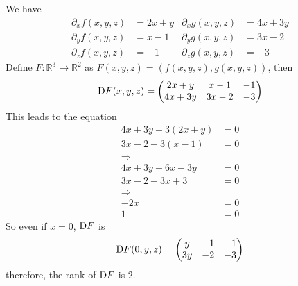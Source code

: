 \begin{solution}
    We have
    \begin{align}
        \partial_x f(x, y, z) &= 2x + y & \partial_x g(x, y, z) &= 4x + 3y \\
        \partial_y f(x, y, z) &= x - 1 & \partial_y g(x, y, z) &= 3x - 2 \\
        \partial_z f(x, y, z) &= -1 & \partial_z g(x, y, z) &= -3
    \end{align}
    Define \(F: \mathbb{R}^3 \rightarrow \mathbb{R}^2\) as \(F(x, y, z) = (f(x, y, z), g(x, y, z))\), then
    \begin{align}
        \mathop{}\!\mathrm{D} F (x, y, z) =
        \begin{pmatrix}
            2x + y & x - 1 & - 1 \\
            4x + 3y & 3x - 2 & -3 
        \end{pmatrix}
    \end{align}
    This leads to the equation
    \begin{align}
        4x + 3y - 3(2x + y) &= 0 \\
        3x - 2 - 3(x - 1) &= 0 \\
        \Rightarrow  \\
        4x + 3y - 6x - 3y &=0\\
        3x -2 -3x + 3 &= 0 \\
        \Rightarrow \\
        -2x &= 0 \\
        1 &= 0
    \end{align}
    So even if \(x = 0\), \(\mathop{}\!\mathrm{D} F\) is
    \begin{align}
        \mathop{}\!\mathrm{D} F (0, y, z) =
        \begin{pmatrix}
            y  & -1 & -1 \\
            3y & -2 & -3 \\
        \end{pmatrix}
    \end{align}
    therefore, the rank of \(\mathop{}\!\mathrm{D} F\) is \(2\).
\end{solution}